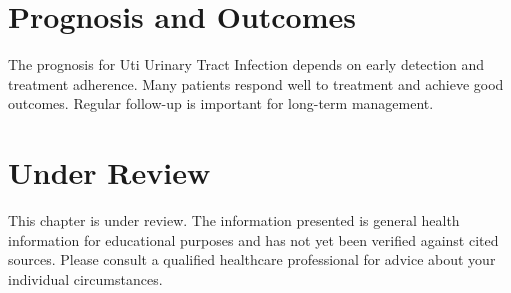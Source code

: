\section*{Prognosis and Outcomes}
The prognosis for Uti Urinary Tract Infection depends on early detection and treatment adherence. Many patients respond well to treatment and achieve good outcomes. Regular follow-up is important for long-term management.
\section*{Under Review}
This chapter is under review. The information presented is general health information for educational purposes and has not yet been verified against cited sources. Please consult a qualified healthcare professional for advice about your individual circumstances.


\clearpage
